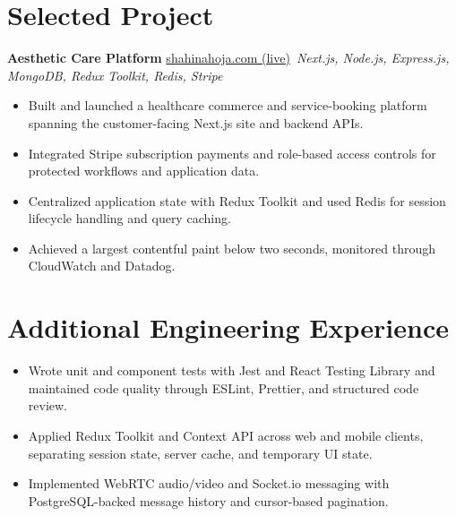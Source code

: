 \documentclass[11pt,a4paper,sans]{moderncv}
\begin{document}

\section{Selected Project}
\vspace{1pt}
\textbf{Aesthetic Care Platform} \hfill \href{https://shahinahoja.com/}{shahinahoja.com (live)}\
\textit{Next.js, Node.js, Express.js, MongoDB, Redux Toolkit, Redis, Stripe}
\begin{itemize}
\item {Built and launched a healthcare commerce and service-booking platform spanning the customer-facing Next.js site and backend APIs.}
\item {Integrated Stripe subscription payments and role-based access controls for protected workflows and application data.}
\item {Centralized application state with Redux Toolkit and used Redis for session lifecycle handling and query caching.}
\item {Achieved a largest contentful paint below two seconds, monitored through CloudWatch and Datadog.}
\end{itemize}

\section{Additional Engineering Experience}
\vspace{1pt}
\begin{itemize}
    \item {Wrote unit and component tests with Jest and React Testing Library and maintained code quality through ESLint, Prettier, and structured code review.}
    \item {Applied Redux Toolkit and Context API across web and mobile clients, separating session state, server cache, and temporary UI state.}
    \item {Implemented WebRTC audio/video and Socket.io messaging with PostgreSQL-backed message history and cursor-based pagination.}
\end{itemize}
\end{document}
